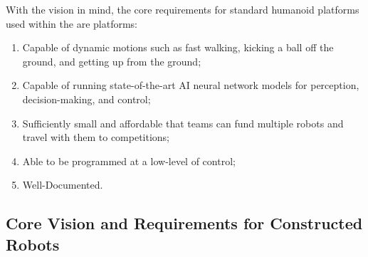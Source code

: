 With the \leaguenameabbr vision in mind, the core requirements for standard humanoid platforms used within the \leaguenameabbr are platforms:
\begin{enumerate}
    \item Capable of dynamic motions such as fast walking, kicking a ball off the ground, and getting up from the ground;
    \item Capable of running state-of-the-art AI neural network models for perception, decision-making, and control;
    \item Sufficiently small and affordable that teams can fund multiple robots and travel with them to competitions;
    \item Able to be programmed at a low-level of control;
    \item Well-Documented.
\end{enumerate}

\subsection{Core Vision and Requirements for Constructed Robots}
